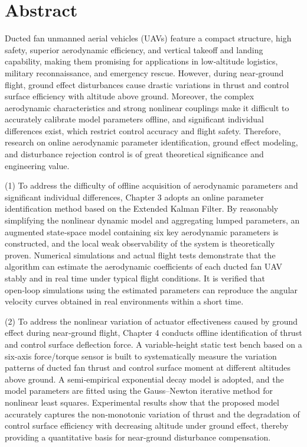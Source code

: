 \chapter{Abstract}
Ducted fan unmanned aerial vehicles (UAVs) feature a compact structure, high safety, superior aerodynamic efficiency, and vertical takeoff and landing capability, making them promising for applications in low‑altitude logistics, military reconnaissance, and emergency rescue. However, during near‑ground flight, ground effect disturbances cause drastic variations in thrust and control surface efficiency with altitude above ground. Moreover, the complex aerodynamic characteristics and strong nonlinear couplings make it difficult to accurately calibrate model parameters offline, and significant individual differences exist, which restrict control accuracy and flight safety. Therefore, research on online aerodynamic parameter identification, ground effect modeling, and disturbance rejection control is of great theoretical significance and engineering value.

(1) To address the difficulty of offline acquisition of aerodynamic parameters and significant individual differences, Chapter 3 adopts an online parameter identification method based on the Extended Kalman Filter. By reasonably simplifying the nonlinear dynamic model and aggregating lumped parameters, an augmented state‑space model containing six key aerodynamic parameters is constructed, and the local weak observability of the system is theoretically proven. Numerical simulations and actual flight tests demonstrate that the algorithm can estimate the aerodynamic coefficients of each ducted fan UAV stably and in real time under typical flight conditions. It is verified that open‑loop simulations using the estimated parameters can reproduce the angular velocity curves obtained in real environments within a short time.

(2) To address the nonlinear variation of actuator effectiveness caused by ground effect during near‑ground flight, Chapter 4 conducts offline identification of thrust and control surface deflection force. A variable‑height static test bench based on a six‑axis force/torque sensor is built to systematically measure the variation patterns of ducted fan thrust and control surface moment at different altitudes above ground. A semi‑empirical exponential decay model is adopted, and the model parameters are fitted using the Gauss–Newton iterative method for nonlinear least squares. Experimental results show that the proposed model accurately captures the non‑monotonic variation of thrust and the degradation of control surface efficiency with decreasing altitude under ground effect, thereby providing a quantitative basis for near‑ground disturbance compensation.


